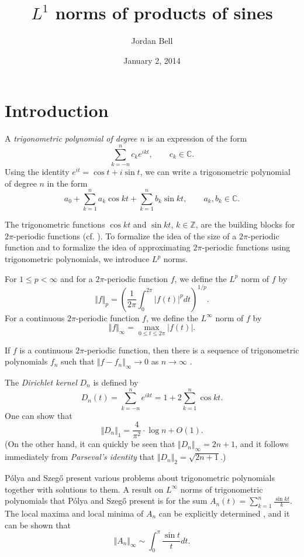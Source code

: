 \documentclass{article}
\newcommand{\norm}[1]{\Vert #1 \Vert}
\begin{document}
\title{$L^1$ norms of products of sines}
\author{Jordan Bell}
\date{January 2, 2014}

\maketitle

\section{Introduction}
A {\em trigonometric polynomial of degree $n$} is an expression  of the form
\[
\sum_{k=-n}^n c_k e^{ikt}, \qquad c_k \in \mathbb{C}.
\]
Using the identity $e^{it}=\cos t+i\sin t$, we can write a trigonometric polynomial of degree $n$ in the form
\[
a_0+\sum_{k=1}^n a_k \cos kt + \sum_{k=1}^n b_k \sin kt, \qquad a_k, b_k \in \mathbb{C}.
\]


The trigonometric functions $\cos kt$ and $\sin kt$, $k \in \mathbb{Z}$, are the building blocks for $2\pi$-periodic functions (cf. \cite{MR1204601}). To
formalize the idea of the size of a $2\pi$-periodic function and to formalize the idea of approximating $2\pi$-periodic functions using trigonometric polynomials,
we introduce $L^p$ norms. 

For $1 \leq p < \infty$ and for a $2\pi$-periodic function $f$, we define the $L^p$ norm of $f$ by
\[
\norm{f}_p=\left(\frac{1}{2\pi} \int_0^{2\pi} |f(t)|^p dt \right)^{1/p}.
\]
For a continuous $2\pi$-periodic function $f$, we define the $L^\infty$ norm of $f$ by
\[
\norm{f}_\infty=\max_{0 \leq t \leq 2\pi} |f(t)|.
\] 


If $f$ is a continuous $2\pi$-periodic function, then there is a sequence of trigonometric polynomials $f_n$ such that
$\norm{f-f_n}_\infty \to 0$ as $n \to \infty$
\cite[p.~54, Corollary~5.4]{steinI}. 

The {\em Dirichlet kernel} $D_n$ is defined by
\[
D_n(t)=\sum_{k=-n}^n e^{ikt}=1+2\sum_{k=1}^n \cos kt.
\]
One can show \cite[p.~71, Exercise 1.1]{katznelson} that
\[
\norm{D_n}_1 = \frac{4}{\pi^2}\cdot \log n+O(1).
\]
(On the other hand, it can quickly be seen that $\norm{D_n}_\infty=2n+1$, and it follows immediately from {\em Parseval's identity} that
$\norm{D_n}_2=\sqrt{2n+1}$.)

P\'olya and Szeg{\H o} \cite[Part VI]{polya} present various problems about trigonometric polynomials together  with solutions to them.
A result on $L^\infty$ norms of trigonometric polynomials that P\'olya and Szeg{\H o} present is for the sum $A_n(t)=\sum_{k=1}^n \frac{\sin kt}{k}$. The local maxima and local minima of $A_n$ can be
explicitly determined \cite[p.~74, no.~23]{polya}, and 
it can be shown that \cite[p.~74, no.~25]{polya}
\[
\norm{A_n}_\infty \sim
\int_0^\pi \frac{\sin t}{t} dt.
\]
\end{document}

